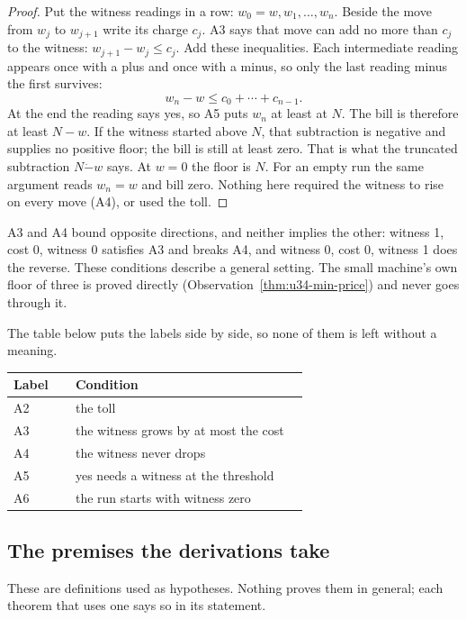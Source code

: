 \documentclass[11pt,twoside]{article}
\theoremstyle{thielethm}
\theoremstyle{thieledef}
\theoremstyle{thieledef}
\theoremstyle{thieledef}
\theoremstyle{thielethm}
\theoremstyle{thieleobs}
\theoremstyle{thielethm}
\begin{document}
\begin{proof}
Put the witness readings in a row: $w_0=w,w_1,\ldots,w_n$.
Beside the move from $w_j$ to $w_{j+1}$ write its charge $c_j$.
A3 says that move can add no more than $c_j$ to the witness:
$w_{j+1}-w_j\le c_j$. Add these inequalities. Each intermediate
reading appears once with a plus and once with a minus, so only the last
reading minus the first survives:
\[
 w_n-w\le c_0+\cdots+c_{n-1}.
\]
At the end the reading says yes, so A5 puts $w_n$ at least at $N$.
The bill is therefore at least $N-w$. If the witness started above $N$,
that subtraction is negative and supplies no positive floor; the bill is
still at least zero. That is what the truncated subtraction
$N\mathbin{\dot{-}}w$ says. At $w=0$ the floor is $N$.
For an empty run the same argument reads $w_n=w$ and bill zero.
Nothing here required the witness to rise on every move (A4), or used the toll.
\end{proof}

A3 and A4 bound opposite
directions, and neither implies the other: witness 1, cost 0, witness 0 satisfies A3 and
breaks A4, and witness 0, cost 0, witness 1 does the reverse. These conditions describe a general setting.
The small machine's own floor of three is proved directly (Observation~\ref{thm:u34-min-price})
and never goes through it.

The table below puts the labels side by side, so none of them is left without a meaning.

\begingroup\small
\begin{longtable}{@{}>{\raggedright\arraybackslash}p{0.2\linewidth}>{\raggedright\arraybackslash}p{0.75\linewidth}@{}}
\toprule
\textbf{Label} & \textbf{Condition} \\
\midrule
\endhead
\bottomrule
\endlastfoot
A2 & the toll \\
A3 & the witness grows by at most the cost \\
A4 & the witness never drops \\
A5 & yes needs a witness at the threshold \\
A6 & the run starts with witness zero \\
\end{longtable}
\endgroup

\subsection{The premises the derivations take}

These are definitions used as hypotheses. Nothing proves them in general; each theorem that
uses one says so in its statement.
\end{document}
